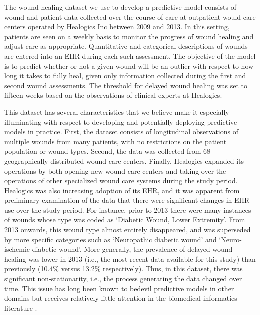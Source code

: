 The wound healing dataset we use to develop a predictive model
consists of wound and patient data collected over the course of care
at outpatient would care centers operated by Healogics Inc between
2009 and 2013.  In this setting, patients are seen on a weekly basis
to monitor the progress of wound healing and adjust care as
appropriate.  Quantitative and categorical descriptions of wounds are
entered into an EHR during each such assessment.  The objective of the
model is to predict whether or not a given wound will be an outlier
with respect to how long it takes to fully heal, given only
information collected during the first and second wound assessments.
The threshold for delayed wound healing was set to fifteen weeks based
on the observations of clinical experts at Healogics.

This dataset has several characteristics that we believe make it
especially illuminating with respect to developing and potentially
deploying predictive models in practice.  First, the dataset consists
of longitudinal observations of multiple wounds from many patients,
with no restrictions on the patient population or wound types.
Second, the data was collected from 68 geographically distributed
wound care centers.  Finally, Healogics expanded its operations by
both opening new wound care centers and taking over the operations of
other specialized wound care systems during the study period.
Healogics was also increasing adoption of its EHR, and it was apparent
from preliminary examination of the data that there were significant
changes in EHR use over the study period.  For instance, prior to 2013
there were many instances of wounds whose type was coded as ‘Diabetic
Wound, Lower Extremity’.  From 2013 onwards, this wound type almost
entirely disappeared, and was superseded by more specific categories
such as ‘Neuropathic diabetic wound’ and ‘Neuro-ischemic diabetic
wound’.  More generally, the prevalence of delayed wound healing was
lower in 2013 (i.e., the most recent data available for this study)
than previously (10.4\% versus 13.2\% respectively).  Thus, in this
dataset, there was significant non-stationarity, i.e., the process
generating the data changed over time.  This issue has long been known
to bedevil predictive models in other domains but receives relatively
little attention in the biomedical informatics literature
\cite{Bickel2009,Hoens2012,Moreno2011}.

